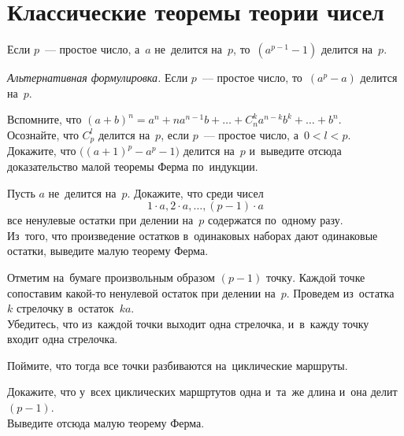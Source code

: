 
\section*{Классические теоремы теории чисел}


\begingroup
    \ifx\mathup\undefined
        \def\eulerphi{\upphi}
    \else
        \def\eulerphi{\mathup{\phi}}
    \fi

Если $p$~--- простое число, а~$a$ не~делится на~$p$, то~$(a^{p-1} - 1)$ делится на~$p$.
\par
\emph{Альтернативная формулировка.}
Если $p$~--- простое число, то~$(a^p - a)$ делится на~$p$.

\begin{problems}

\item
\subproblem
Вспомните, что
\(
    (a + b)^n
=
    a^n + n a^{n-1} b +
    \ldots +
    C_{n}^{k} a^{n-k} b^k +
    \ldots +
    b^n
\).
\\
\subproblem
Осознайте, что $C_{p}^{l}$ делится на~$p$, если $p$~--- простое число,
а~$0 < l < p$.
\\
\subproblem
Докажите, что $\bigl( (a + 1)^p - a^p - 1 \bigr)$ делится на~$p$ и~выведите
отсюда доказательство малой теоремы Ферма по~индукции.

\item \subproblem
Пусть $a$ не~делится на~$p$.
Докажите, что среди чисел
\[
    1 \cdot a, 2 \cdot a, \ldots, (p - 1) \cdot a
\]
все ненулевые остатки при делении на~$p$ содержатся по~одному разу.
\\
\subproblem
Из~того, что произведение остатков в~одинаковых наборах дают одинаковые
остатки, выведите малую теорему Ферма.

\item
\subproblem
Отметим на~бумаге произвольным образом $(p - 1)$ точку.
Каждой точке сопоставим какой-то ненулевой остаток при делении на~$p$.
Проведем из~остатка~$k$ стрелочку в~остаток~$k a$.
\\
\subproblem
Убедитесь, что из~каждой точки выходит одна стрелочка, и~в~кажду точку входит
одна стрелочка.
\\
\subproblem

Поймите, что тогда все точки разбиваются на~циклические маршруты.
\\
\subproblem

Докажите, что у~всех циклических маршртутов одна и~та~же длина и~она делит
$(p - 1)$.
\\
\subproblem
Выведите отсюда малую теорему Ферма.

\end{problems}

